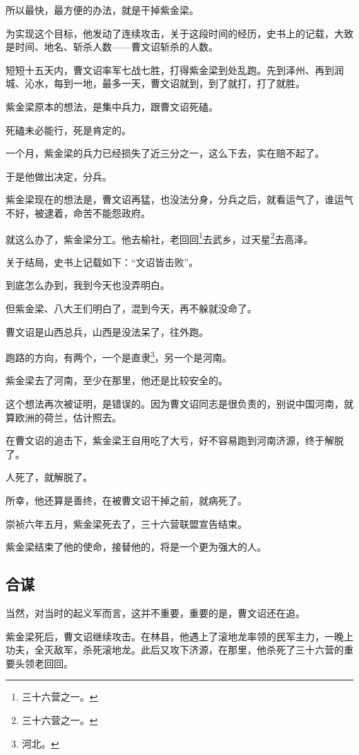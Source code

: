 \begin{multicols}{\theparacolNo}
		所以最快，最方便的办法，就是干掉紫金梁。

		为实现这个目标，他发动了连续攻击，关于这段时间的经历，史书上的记载，大致是时间、地名、斩杀人数——曹文诏斩杀的人数。

		短短十五天内，曹文诏率军七战七胜，打得紫金梁到处乱跑。先到泽州、再到润城、沁水，每到一地，最多一天，曹文诏就到，到了就打，打了就胜。

		紫金梁原本的想法，是集中兵力，跟曹文诏死磕。

		死磕未必能行，死是肯定的。

		一个月，紫金梁的兵力已经损失了近三分之一，这么下去，实在赔不起了。

		于是他做出决定，分兵。

		紫金梁现在的想法是，曹文诏再猛，也没法分身，分兵之后，就看运气了，谁运气不好，被逮着，命苦不能怨政府。

		就这么办了，紫金梁分工。他去榆社，老回回\footnote{三十六营之一。}去武乡，过天星\footnote{三十六营之一。}去高泽。

		关于结局，史书上记载如下：“文诏皆击败”。

		到底怎么办到，我到今天也没弄明白。

		但紫金梁、八大王们明白了，混到今天，再不躲就没命了。

		曹文诏是山西总兵，山西是没法呆了，往外跑。

		跑路的方向，有两个，一个是直隶\footnote{河北。}，另一个是河南。

		紫金梁去了河南，至少在那里，他还是比较安全的。

		这个想法再次被证明，是错误的。因为曹文诏同志是很负责的，别说中国河南，就算欧洲的荷兰，估计照去。

		在曹文诏的追击下，紫金梁王自用吃了大亏，好不容易跑到河南济源，终于解脱了。

		人死了，就解脱了。

		所幸，他还算是善终，在被曹文诏干掉之前，就病死了。

		崇祯六年五月，紫金梁死去了，三十六营联盟宣告结束。

		紫金梁结束了他的使命，接替他的，将是一个更为强大的人。

		\subsection{合谋}
		当然，对当时的起义军而言，这并不重要，重要的是，曹文诏还在追。

		紫金梁死后，曹文诏继续攻击。在林县，他遇上了滚地龙率领的民军主力，一晚上功夫，全灭敌军，杀死滚地龙。此后又攻下济源，在那里，他杀死了三十六营的重要头领老回回。


\end{multicols}
